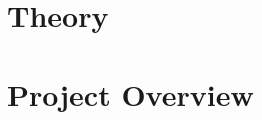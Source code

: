 
\pagebreak

\section{Theory}
    
    
    
    
    
    
    

\section{Project Overview}
    
    
    

\begin{appendices} \appendix
    
\end{appendices}

\printbibliography[heading=bibintoc,title={References}]
